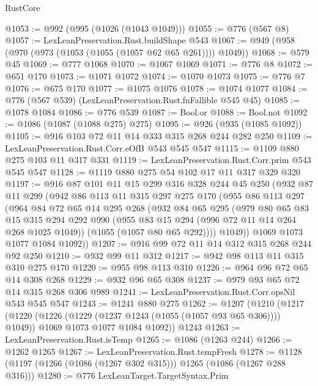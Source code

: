 \begin{lexlean}{RustCore}
\begin{coremodule}
@1053 := @992 (@995 (@1026 (@1043 @1049)))
@1055 := @776 (@567 @8)
@1057 := LexLeanPreservation.Rust.buildShape @543
@1067 := @949 (@958 (@970 (@973 (@1053 (@1055 (@1057 @62 @65 @261)))) @1049))
@1068 := @579 @45
@1069 := @777 @1068
@1070 := @1067 @1069
@1071 := @776 @8
@1072 := @651 @170
@1073 := @1071 @1072
@1074 := @1070 @1073
@1075 := @776 @7
@1076 := @675 @170
@1077 := @1075 @1076
@1078 := @1074 @1077
@1084 := @776 (@567 @539) (LexLeanPreservation.Rust.fnFallible @545 @45)
@1085 := @1078 @1084
@1086 := @776 @539
@1087 := Bool.or
@1088 := Bool.not
@1092 := @1086 (@1087 (@1088 @275) @275)
@1095 := @926 (@935 (@1085 @1092))
@1105 := @916 @103 @72 @11 @14 @333 @315 @268 @244 @282 @250
@1109 := LexLeanPreservation.Rust.Corr.eOfB @543 @545 @547
@1115 := @1109 @880 @275 @103 @11 @317 @331
@1119 := LexLeanPreservation.Rust.Corr.prim @543 @545 @547
@1128 := @1119 @880 @275 @54 @102 @17 @11 @317 @329 @320
@1197 := @916
    @87
    @101
    @11
    @15
    @299
    @316
    @328
    @244
    @45
    @250
    (@932
      @87
      @11
      @299
      (@942
        @86
        @113
        @11
        @315
        @297
        @275
        @170
        (@955
          @86
          @113
          @297
          (@964
            @84
            @72
            @65
            @14
            @295
            @268
            (@932
              @84
              @65
              @295
              (@979
                @80
                @65
                @83
                @15
                @315
                @294
                @292
                @990
                (@955 @83 @15 @294 (@996 @72 @11 @14 @264 @268 @1025 @1049))
                (@1055 (@1057 @80 @65 @292))))
            @1049))
        @1069
        @1073
        @1077
        @1084
        @1092))
@1207 := @916 @99 @72 @11 @14 @312 @315 @268 @244 @92 @250
@1210 := @932 @99 @11 @312
@1217 := @942 @98 @113 @11 @315 @310 @275 @170
@1220 := @955 @98 @113 @310
@1226 := @964 @96 @72 @65 @14 @308 @268
@1229 := @932 @96 @65 @308
@1237 := @979 @93 @65 @72 @14 @315 @268 @306 @989
@1241 := LexLeanPreservation.Rust.Corr.opsNil @543 @545 @547
@1243 := @1241 @880 @275
@1262 := @1207
    (@1210
      (@1217
        (@1220 (@1226 (@1229 (@1237 @1243 (@1055 (@1057 @93 @65 @306)))) @1049))
        @1069
        @1073
        @1077
        @1084
        @1092))
    @1243
@1263 := LexLeanPreservation.Rust.isTemp
@1265 := @1086 (@1263 @244)
@1266 := @1262 @1265
@1267 := LexLeanPreservation.Rust.tempFresh
@1278 := @1128 (@1197 (@1266 (@1086 (@1267 @302 @315))) @1265 (@1086 (@1267 @288 @316)))
@1280 := @776 LexLeanTarget.TargetSyntax.Prim

\end{coremodule}
\end{lexlean}
